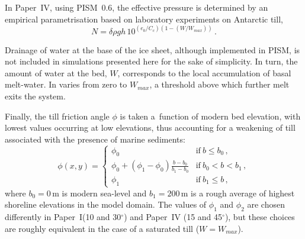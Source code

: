 \documentclass{article}
\newcommand{\CCLI}[0]{Paper~I}      %
\newcommand{\CCYC}[0]{Paper~IV}     %
\begin{document}
In {\CCYC}, using PISM~0.6, the effective pressure is determined by an
empirical parametrisation based on laboratory experiments on Antarctic till,
\begin{equation}
    N = \delta \rho gh \, 10^{(e_0/C_c) (1 - (W/W_{max}))} \,.
\end{equation}

Drainage of water at the base of the ice sheet, although implemented in PISM,
is not included in simulations presented here for the sake of simplicity.
In turn, the amount of water at the bed, $W$, corresponds to the local
accumulation of basal melt-water. In varies from zero to $W_{max}$, a threshold
above which further melt exits the system.

Finally, the till friction angle $\phi$ is taken a~function of modern bed
elevation, with lowest values occurring at low elevations, thus accounting for
a weakening of till associated with the presence of marine sediments:
\begin{equation}
    \phi(x,y) =
    \begin{cases}
        \phi_0 & \text{if}\ b \le b_0 \,, \\
        \phi_0 + (\phi_1-\phi_0) \frac{b - b_0}{b_1-b_0}
                & \text{if}\ b_0 < b < b_1 \,, \\
        \phi_1 & \text{if}\ b_1 \le b \,,
    \end{cases}
\end{equation}
where $b_0=0$\,m is modern sea-level and $b_1=200$\,m is a rough average of
highest shoreline elevations in the model domain. The values of $\phi_1$ and
$\phi_2$ are chosen differently in \CCLI (10 and 30$^\circ$) and \CCYC
(15 and 45$^\circ$), but these choices are roughly equivalent in the case of a
saturated till ($W=W_{max}$).
\end{document}
